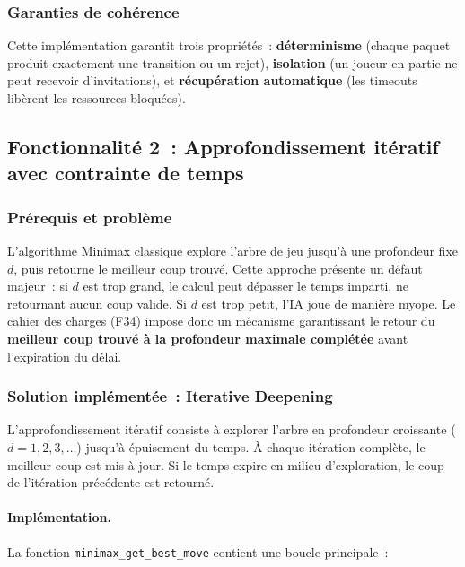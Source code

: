 \documentclass[a4paper]{article}
\begin{document}
\subsubsection{Garanties de cohérence}
 
Cette implémentation garantit trois propriétés~: \textbf{déterminisme} (chaque paquet produit exactement une transition ou un rejet), \textbf{isolation} (un joueur en partie ne peut recevoir d'invitations), et \textbf{récupération automatique} (les timeouts libèrent les ressources bloquées).
 
\newpage
\subsection{Fonctionnalité 2~: Approfondissement itératif avec contrainte de temps}
\label{subsec:iterative-deepening}

\subsubsection{Prérequis et problème}

L'algorithme Minimax classique explore l'arbre de jeu jusqu'à une profondeur fixe $d$, puis retourne le meilleur coup trouvé. Cette approche présente un défaut majeur~: si $d$ est trop grand, le calcul peut dépasser le temps imparti, ne retournant aucun coup valide. Si $d$ est trop petit, l'IA joue de manière myope. Le cahier des charges (F34) impose donc un mécanisme garantissant le retour du \textbf{meilleur coup trouvé à la profondeur maximale complétée} avant l'expiration du délai.

\subsubsection{Solution implémentée~: Iterative Deepening}

L'approfondissement itératif consiste à explorer l'arbre en profondeur croissante ($d = 1, 2, 3, \ldots$) jusqu'à épuisement du temps. À chaque itération complète, le meilleur coup est mis à jour. Si le temps expire en milieu d'exploration, le coup de l'itération précédente est retourné.

\paragraph{Implémentation.}
La fonction \texttt{minimax\_get\_best\_move} contient une boucle principale~:
\end{document}
